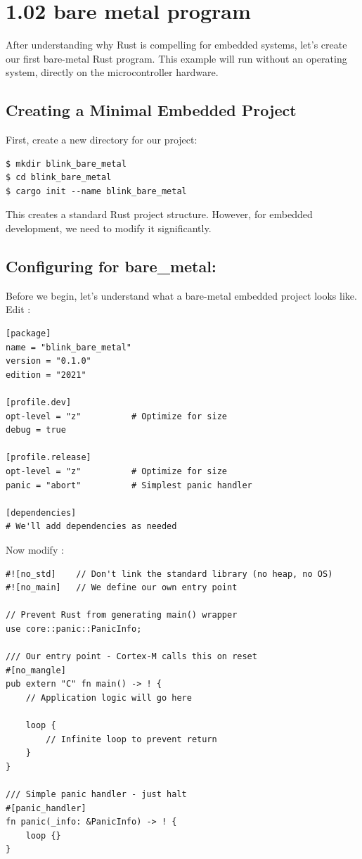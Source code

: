 \section{1.02 bare metal program}
\label{sec:1.02 bare metal program}


After understanding why Rust is compelling for embedded systems, let's create our first bare-metal Rust program. This example will run without an operating system, directly on the microcontroller hardware.

\subsection{Creating a Minimal Embedded Project}

First, create a new directory for our project:

\begin{verbatim}
$ mkdir blink_bare_metal
$ cd blink_bare_metal
$ cargo init --name blink_bare_metal
\end{verbatim}

This creates a standard Rust project structure. However, for embedded development, we need to modify it significantly.

\subsection{Configuring for bare\_metal: }

Before we begin, let's understand what a bare-metal embedded project looks like. Edit :

\begin{verbatim}
[package]
name = "blink_bare_metal"
version = "0.1.0"
edition = "2021"

[profile.dev]
opt-level = "z"          # Optimize for size
debug = true

[profile.release]
opt-level = "z"          # Optimize for size
panic = "abort"          # Simplest panic handler

[dependencies]
# We'll add dependencies as needed
\end{verbatim}

Now modify :

\begin{verbatim}
#![no_std]    // Don't link the standard library (no heap, no OS)
#![no_main]   // We define our own entry point

// Prevent Rust from generating main() wrapper
use core::panic::PanicInfo;

/// Our entry point - Cortex-M calls this on reset
#[no_mangle]
pub extern "C" fn main() -> ! {
    // Application logic will go here

    loop {
        // Infinite loop to prevent return
    }
}

/// Simple panic handler - just halt
#[panic_handler]
fn panic(_info: &PanicInfo) -> ! {
    loop {}
}
\end{verbatim}

